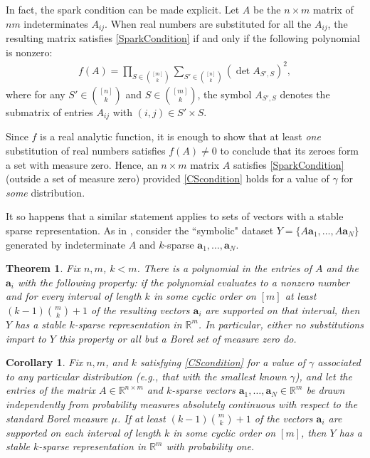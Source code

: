 \documentclass[journal, twocolumn]{IEEEtran}
\newtheorem{theorem}{Theorem}
\newtheorem{corollary}{Corollary}
\begin{document}
In fact, the spark condition can be made explicit.  Let $A$  be the $n \times m$ matrix of $nm$ indeterminates $A_{ij}$. When real numbers are substituted for all the $A_{ij}$, the resulting matrix satisfies \eqref{SparkCondition} if and only if the following polynomial is nonzero:
\begin{align*}
f(A) = \prod_{S \in {[m] \choose k}} \sum_{S' \in {[n] \choose k}} (\det A_{S',S})^2,
\end{align*}
%
where for any $S' \in {[n] \choose k}$ and $S \in {[m] \choose k}$, the symbol $A_{S',S}$ denotes the submatrix of entries $A_{ij}$ with $(i,j) \in S' \times S$. 

Since $f$ is a real analytic function, it is enough to show that at least \emph{one} substitution of real numbers satisfies $f(A) \neq 0$ to conclude that its zeroes form a set with measure zero. Hence, an $n \times m$ matrix $A$ satisfies \eqref{SparkCondition} (outside a set of measure zero) provided \eqref{CScondition} holds for a value of $\gamma$ for \emph{some}  distribution. 

It so happens that a similar statement applies to sets of vectors with a stable sparse representation. As in \cite[Sec.~IV]{Hillar15}, consider the ``symbolic" dataset $Y = \{A\mathbf{a}_1,\ldots,A \mathbf{a}_N\}$ generated by indeterminate $A$ and $k$-sparse $\mathbf{a}_1, \ldots, \mathbf{a}_N$. 
\begin{theorem}\label{robustPolythm} 
Fix $n, m$, $k < m$. There is a polynomial in the entries of $A$ and the $\mathbf{a}_i$ with the following property:  if the polynomial evaluates to a nonzero number and for every interval of length $k$ in some cyclic order on $[m]$ at least \mbox{$(k-1){m \choose k}+1$} of the resulting vectors $\mathbf{a}_i$ are supported on that interval, then $Y$ has a stable $k$-sparse representation in $\mathbb{R}^m$. In particular, either no substitutions impart to $Y$ this property or all but a Borel set of measure zero do. 
\end{theorem}


\begin{corollary}\label{ProbabilisticCor}
Fix $n, m$, and $k$ satisfying \eqref{CScondition} for a value of $\gamma$ associated to any particular distribution (e.g., that with the smallest known $\gamma$), and let the entries of the matrix $A \in \mathbb{R}^{n \times m}$ and $k$-sparse vectors $\mathbf{a}_1, \ldots, \mathbf{a}_N \in \mathbb{R}^m$ be drawn independently from probability measures absolutely continuous with respect to the standard Borel measure $\mu$. If at least $(k-1){m \choose k} + 1$ of the vectors $\mathbf{a}_i$ are supported on each interval of length $k$ in some cyclic order on $[m]$, then $Y$ has a stable $k$-sparse representation in $\mathbb{R}^m$ with probability one.
\end{corollary}
\end{document}
